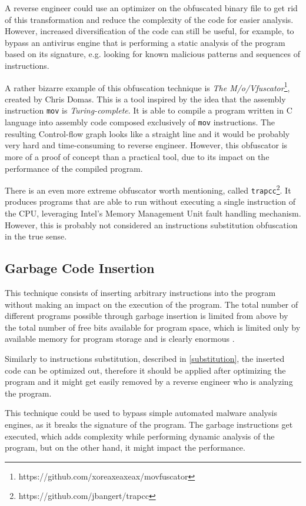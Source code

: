\documentclass[
  digital, %
  notable,   %
  twoside, %
  nolof,     %
  nolot,     %
]{fithesis3}
\theoremstyle{definition}
\begin{document}
A reverse engineer could use an optimizer on the obfuscated binary file to get rid of this transformation and reduce the complexity of the code for easier analysis. However, increased diversification of the code can still be useful, for example, to bypass an antivirus engine that is performing a static analysis of the program based on its signature, e.g. looking for known malicious patterns and sequences of instructions.

A rather bizarre example of this obfuscation technique is \textit{The M/o/Vfuscator}\footnote{https://github.com/xoreaxeaxeax/movfuscator}, created by Chris Domas. This is a tool inspired by the idea that the assembly instruction \texttt{mov} is \textit{Turing-complete}. It is able to compile a program written in C language into assembly code composed exclusively of \texttt{mov} instructions. The resulting Control-flow graph looks like a straight line and it would be probably very hard and time-consuming to reverse engineer. However, this obfuscator is more of a proof of concept than a practical tool, due to its impact on the performance of the compiled program. 

There is an even more extreme obfuscator worth mentioning, called \texttt{trapcc}\footnote{https://github.com/jbangert/trapcc}. It produces programs that are able to run without executing a single instruction of the CPU, leveraging Intel's Memory Management Unit fault handling mechanism. However, this is probably not considered an instructions substitution obfuscation in the true sense. 

\subsection{Garbage Code Insertion} \label{garbage}
This technique consists of inserting arbitrary instructions into the program without making an impact on the execution of the program. The total number of different programs possible
through garbage insertion is limited from above by the total number of free bits available for program space, which is limited only by available memory for program storage and is clearly enormous \cite{os_protection}. 

Similarly to instructions substitution, described in \ref{substitution}, the inserted code can be optimized out, therefore it should be applied after optimizing the program and it might get easily removed by a reverse engineer who is analyzing the program. 

This technique could be used to bypass simple automated malware analysis engines, as it breaks the signature of the program. The garbage instructions get executed, which adds complexity while performing dynamic analysis of the program, but on the other hand, it might impact the performance. 
\end{document}
